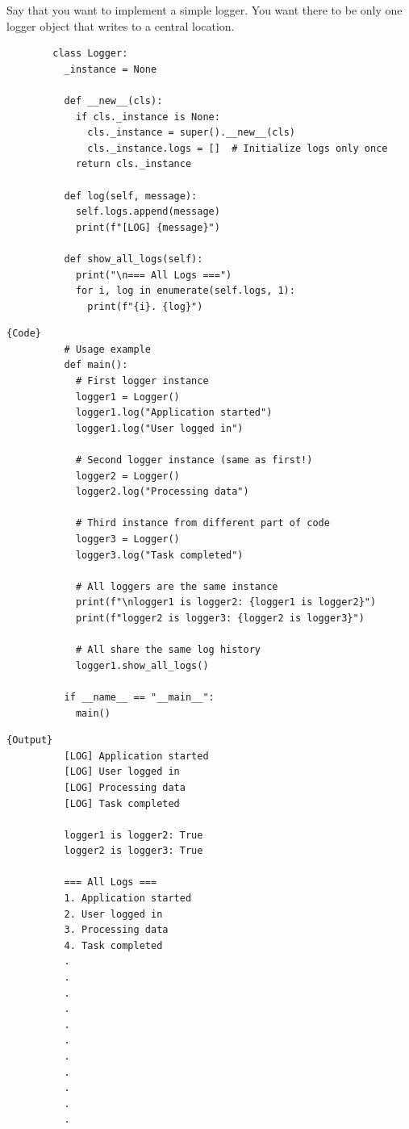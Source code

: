     \begin{example}[Logger]
      \label{ex:logger}
      Say that you want to implement a simple logger. You want there to be only one logger object that writes to a central location. 

      \begin{lstlisting}
        class Logger:
          _instance = None
          
          def __new__(cls):
            if cls._instance is None:
              cls._instance = super().__new__(cls)
              cls._instance.logs = []  # Initialize logs only once
            return cls._instance
          
          def log(self, message):
            self.logs.append(message)
            print(f"[LOG] {message}")
          
          def show_all_logs(self):
            print("\n=== All Logs ===")
            for i, log in enumerate(self.logs, 1):
              print(f"{i}. {log}")
      \end{lstlisting}

      \noindent\begin{minipage}{.65\textwidth}
        \begin{lstlisting}[]{Code}
          # Usage example
          def main():
            # First logger instance
            logger1 = Logger()
            logger1.log("Application started")
            logger1.log("User logged in")
            
            # Second logger instance (same as first!)
            logger2 = Logger()
            logger2.log("Processing data")
            
            # Third instance from different part of code
            logger3 = Logger()
            logger3.log("Task completed")
            
            # All loggers are the same instance
            print(f"\nlogger1 is logger2: {logger1 is logger2}")
            print(f"logger2 is logger3: {logger2 is logger3}")
            
            # All share the same log history
            logger1.show_all_logs()

          if __name__ == "__main__":
            main() 
        \end{lstlisting}
        \end{minipage}
        \hfill
        \begin{minipage}{.34\textwidth}
        \begin{lstlisting}[]{Output}
          [LOG] Application started
          [LOG] User logged in
          [LOG] Processing data
          [LOG] Task completed

          logger1 is logger2: True
          logger2 is logger3: True

          === All Logs ===
          1. Application started
          2. User logged in
          3. Processing data
          4. Task completed
          .
          .
          .
          .
          .
          .
          .
          .
          .
          .
          .
        \end{lstlisting}
      \end{minipage}
    \end{example}
